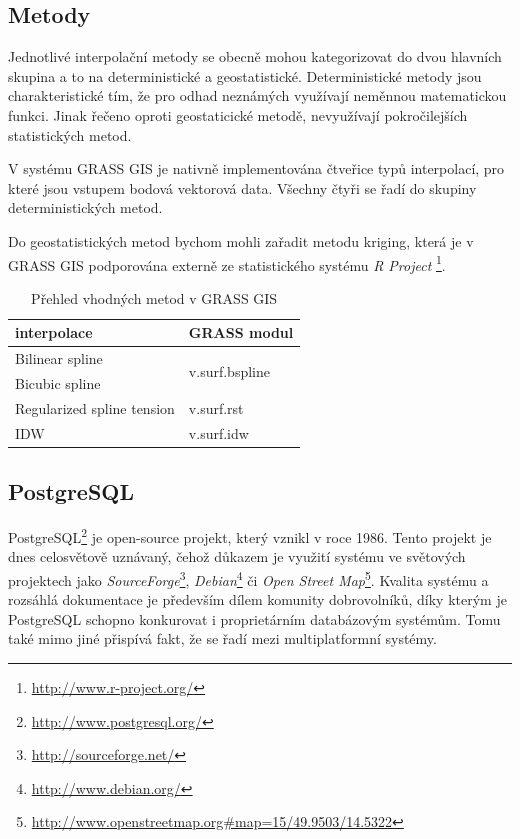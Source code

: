 \documentclass[a4paper,12pt,oneside]{report}
\begin{document}
\subsection{Metody}
Jednotlivé interpolační metody se obecně mohou kategorizovat do dvou hlavních skupina a to na deterministické a geostatistické. 
Deterministické metody jsou charakteristické tím, že pro odhad neznámých využívají neměnnou matematickou funkci. Jinak řečeno oproti geostaticické metodě, nevyužívají pokročilejších statistických metod.

V systému GRASS GIS je nativně implementována čtveřice typů interpolací, pro které jsou vstupem  bodová vektorová data. Všechny čtyři se řadí do skupiny deterministických metod.

Do geostatistických metod bychom mohli zařadit metodu kriging, která je v GRASS GIS podporována externě ze statistického systému \textit{R Project} \footnote{\url{http://www.r-project.org/}}.

\begin{table}[h]
\centering
\begin{tabular}{|ll|}
\hline
interpolace & GRASS modul \\ \hline\hline
Bilinear spline & \multirow{2}{*}{v.surf.bspline} \\
Bicubic spline &  \\
Regularized spline tension & v.surf.rst \\
IDW & v.surf.idw \\ \hline
\end{tabular}
\caption{Přehled vhodných metod v GRASS GIS}
\label{my-label}
\end{table}


\subsection{PostgreSQL}
PostgreSQL\footnote{\url{http://www.postgresql.org/}} je open-source projekt, který vznikl v roce 1986. Tento projekt je dnes celosvětově uznávaný, čehož důkazem je využití systému ve světových projektech jako \textit{SourceForge}\footnote{\url{http://sourceforge.net/}}, \textit{Debian}\footnote{\url{http://www.debian.org/}} či \textit{Open Street Map}\footnote{\url{http://www.openstreetmap.org\#map=15/49.9503/14.5322}}. Kvalita systému a rozsáhlá dokumentace je především dílem komunity dobrovolníků, díky kterým je PostgreSQL schopno konkurovat i proprietárním databázovým systémům. Tomu také mimo jiné přispívá fakt, že se řadí mezi multiplatformní systémy.\cite{postgre}
\end{document}
